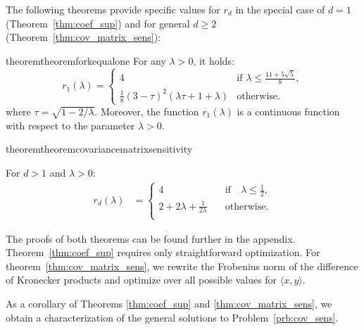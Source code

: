 The following theorems provide specific values for $r_d$ in 
the special case of $d=1$ (Theorem~\ref{thm:coef_sup}) and 
for general $d\geq 2$ (Theorem~\ref{thm:cov_matrix_sens}):

\begin{restatable}[$d=1$]{theorem}{theoremforkequalone}
\label{thm:coef_sup}
    For any $\lambda > 0$, it holds:
    \begin{equation}
        \label{eq:r_k=1}
        r_1(\lambda)    
        \!=\!\begin{cases}
            4  & \text{if } \lambda \le \frac{11 + 5\sqrt{5}}{8}, \\
            \frac{1}{8} (3- \tau)^2 (\lambda \tau + 1 + \lambda)   & \text{otherwise.} 
        \end{cases}
    \end{equation}
where $\tau = \sqrt{1 - 2 /\lambda}$. Moreover, the function $r_1(\lambda)$ is a continuous function with respect to the parameter $\lambda > 0$. 
\end{restatable}

\begin{restatable}{theorem}{theoremcovariancematrixsensitivity}
\label{thm:cov_matrix_sens}

For $d > 1$ and $\lambda > 0$:
\begin{align}
    r_d(\lambda) 
    &= \begin{cases}
        4 \quad &\text{if} \quad \lambda \leq \frac{1}{2},\\
        2 + 2\lambda + \frac{1}{2\lambda} \quad  & \text{otherwise.}\\
    \end{cases}
    \label{eq:rd_lambda}
\end{align}
\end{restatable}

The proofs of both theorems can be found further in the appendix.
%
Theorem~\ref{thm:coef_sup} requires only straightforward optimization. 
%
For theorem~\ref{thm:cov_matrix_sens}, we rewrite the Frobenius norm of 
the difference of Kronecker products and optimize over all possible values
for $\langle x, y \rangle$.

As a corollary of Theorems \ref{thm:coef_sup} and \ref{thm:cov_matrix_sens},
we obtain a characterization of the general solutions to Problem~\ref{prb:cov_sens}.

